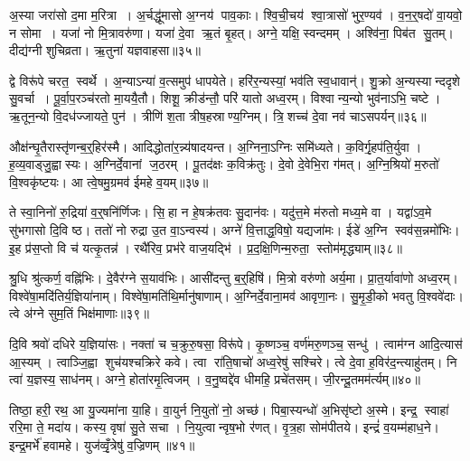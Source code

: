 अ॒स्या जरा॑सो द॒मा म॒रित्रा। अ॒र्चद्धू॑मासो अ॒ग्नय॑ पाव॒काः। श्वि॒ची॒चय॑ श्वा॒त्रासो॑ भुर॒ण्यव॑। व॒न॒र्॒षदो॑ वा॒यवो॒ न सोमा। यजा॑ नो मि॒त्रावरु॑णा। यजा॑ दे॒वा ऋ॒तं बृ॒हत्। अग्ने॒ यक्षि॒ स्वन्दमम्। अश्वि॑ना॒ पिब॑त सु॒तम्। दीद्य॑ग्नी शुचिव्रता। ऋ॒तुना॑ यज्ञवाहसा॥३५॥

द्वे विरू॑पे चरत॒ स्वर्थे। अ॒न्याऽन्या॑ व॒त्समुप॑ धापयेते। हरि॑र॒न्यस्यां॒ भव॑ति स्व॒धावान्॑। शु॒क्रो अ॒न्यस्यान्ददृशे सु॒वर्चा। पू॒र्वा॒प॒रञ्च॑रतो मा॒ययै॒तौ। शिशू॒ क्रीड॑न्तौ॒ परि॑ यातो अध्व॒रम्। विश्वान्य॒न्यो भुव॑नाऽभि॒ चष्टे। ऋ॒तून॒न्यो वि॒दध॑ज्जायते॒ पुन॑। त्रीणि॑ श॒ता त्रीष॒हस्राण्य॒ग्निम्। त्रि॒शच्च॑ दे॒वा नव॑ चाऽसपर्यन्॥३६॥

औक्ष॑न्घृ॒तैरास्तृ॑णन्ब॒र्॒हिर॑स्मै। आदिद्धोता॑र॒न्न्य॑षादयन्त। अ॒ग्निना॒ऽग्निः समि॑ध्यते। क॒विर्गृ॒हप॑ति॒र्युवा। ह॒व्य॒वाड्जु॒ह्वास्यः। अ॒ग्निर्दे॒वानां ज॒ठरम्। पू॒तद॑क्षः क॒विक्र॑तुः। दे॒वो दे॒वेभि॒रा ग॑मत्। अ॒ग्नि॒श्रियो॑ म॒रुतो॑ वि॒श्वकृ॑ष्टयः। आ त्वे॒षमु॒ग्रमव॑ ईमहे व॒यम्॥३७॥

ते स्वा॒निनो॑ रु॒द्रिया॑ व॒र्॒षनि॑र्णिजः। सि॒हा न हे॒षक्र॑तवः सु॒दान॑वः। यदु॑त्त॒मे म॑रुतो मध्य॒मे वा। यद्वा॑ऽव॒मे सु॑भगासो दि॒वि ष्ठ। ततो॑ नो रुद्रा उ॒त वा॒ऽन्वस्य॑। अग्ने॑ वि॒त्ताद्ध॒विषो॒ यद्यजा॑मः। ईडे॑ अ॒ग्नि स्वव॑स॒न्नमो॑भिः। इ॒ह प्र॑स॒प्तो वि च॑ यत्कृ॒तन्न॑। रथै॑रिव॒ प्रभ॑रे वाज॒यद्भि॑। प्र॒द॒क्षि॒णिन्म॒रुता॒ स्तोम॑मृद्ध्याम्॥३८॥

श्रु॒धि श्रु॑त्कर्ण॒ वह्नि॑भिः। दे॒वैर॑ग्ने स॒याव॑भिः। आसी॑दन्तु ब॒र्॒हिषि॑। मि॒त्रो वरु॑णो अर्य॒मा। प्रा॒त॒र्यावा॑णो अध्व॒रम्। विश्वे॑षा॒मदि॑तिर्य॒ज्ञिया॑नाम्। विश्वे॑षा॒मति॑थि॒र्मानु॑षाणाम्। अ॒ग्निर्दे॒वाना॒मव॑ आवृणा॒नः। सु॒मृ॒डी॒को भवतु वि॒श्ववे॑दाः। त्वे अ॑ग्ने सुम॒तिं भिक्ष॑माणाः॥३९॥

दि॒वि श्रवो॑ दधिरे य॒ज्ञिया॑सः। नक्ता॑ च च॒क्रुरु॒षसा॒ विरू॑पे। कृ॒ष्णञ्च॒ वर्ण॑मरु॒णञ्च॒ सन्धु॑। त्वाम॑ग्न आदि॒त्यास॑ आ॒स्यम्। त्वाञ्जि॒ह्वा शुच॑यश्चक्रिरे कवे। त्वा रा॑ति॒षाचो॑ अध्व॒रेषु॑ सश्चिरे। त्वे दे॒वा ह॒विर॑द॒न्त्याहु॑तम्। नि त्वा॑ य॒ज्ञस्य॒ साध॑नम्। अग्ने॒ होता॑रमृ॒त्विजम्। व॒नु॒ष्वद्दे॑व धीमहि॒ प्रचे॑तसम्। जी॒रन्दू॒तमम॑र्त्यम्॥४०॥\anuvakamend[य॒ज्ञ॒वा॒ह॒सा॒स॒प॒र्य॒न्व॒यमृ॑द्ध्यां॒ भिक्ष॑माणा॒ प्रचे॑तस॒मेकं च]

तिष्ठा॒ हरी॒ रथ॒ आ यु॒ज्यमा॑ना या॒हि। वा॒युर्न नि॒युतो॑ नो॒ अच्छ॑। पिबा॒स्यन्धो॑ अ॒भिसृ॑ष्टो अ॒स्मे। इन्द्र॒ स्वाहा॑ ररि॒मा ते॒ मदा॑य। कस्य॒ वृषा॑ सु॒ते सचा। नि॒युत्वान्वृष॒भो र॑णत्। वृ॒त्र॒हा सोम॑पीतये। इन्द्रं॑ व॒यम्म॑हाध॒ने। इन्द्र॒मर्भे॑ हवामहे। युज॑व्वृँ॒त्रेषु॑ व॒ज्रिणम्॥४१॥

